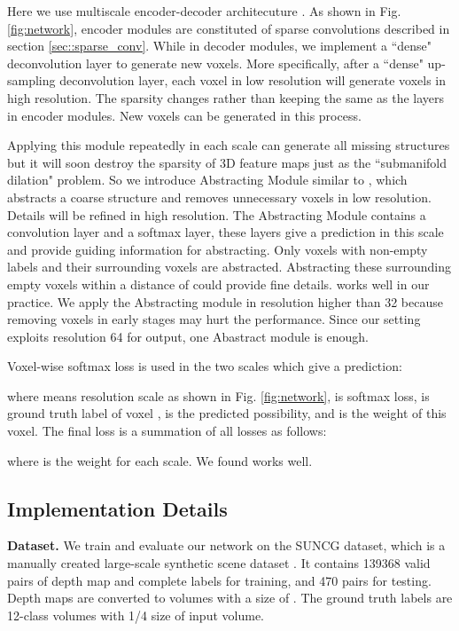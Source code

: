\documentclass[runningheads]{llncs}
\begin{document}
Here we use multiscale encoder-decoder architecuture \cite{ronneberger2015u}.
As shown in Fig. \ref{fig:network}, encoder modules are constituted of sparse convolutions described in section \ref{sec::sparse_conv}. While in decoder modules, we implement a ``dense" deconvolution layer to generate new voxels.
More specifically, after a ``dense" up-sampling deconvolution  layer, each voxel in low resolution will generate  voxels in high resolution. The sparsity changes rather than keeping the same as the layers in encoder modules.
New voxels can be generated in this process.

Applying this module repeatedly in each scale can generate all missing structures but it will soon destroy the sparsity of 3D feature maps just as the ``submanifold dilation" problem.
So we introduce Abstracting Module similar to \cite{Riegler2017,Tatarchenko2017}, which abstracts a coarse structure and removes unnecessary voxels in low resolution. Details will be refined in high resolution.
The Abstracting Module contains a  convolution layer and a softmax layer, these layers give a prediction in this scale and provide guiding information for abstracting. Only voxels with non-empty labels and their surrounding voxels are abstracted.
Abstracting these surrounding empty voxels within a distance of  could provide fine details.  works well in our practice.
We apply the Abstracting module in resolution higher than 32 because removing voxels in early stages may hurt the performance. Since our setting exploits resolution 64 for output, one Abastract module is enough.


Voxel-wise softmax loss is used in the two scales which give a prediction:

where  means resolution scale as shown in Fig. \ref{fig:network},  is softmax loss,  is ground truth label of voxel ,   is the predicted possibility, and  is the weight of this voxel. The final loss is a summation of all losses as follows:

where  is the weight for each scale. We found  works well.

\subsection{Implementation Details}
\textbf{Dataset.} We train and evaluate our network on the SUNCG dataset, which is a manually created large-scale synthetic scene dataset \cite{song2016semantic}. It
contains 139368 valid pairs of depth map and complete labels for training, and 470 pairs for testing. Depth maps are converted to volumes with a size of . The ground truth labels are 12-class volumes with 1/4 size of input volume.
\end{document}
